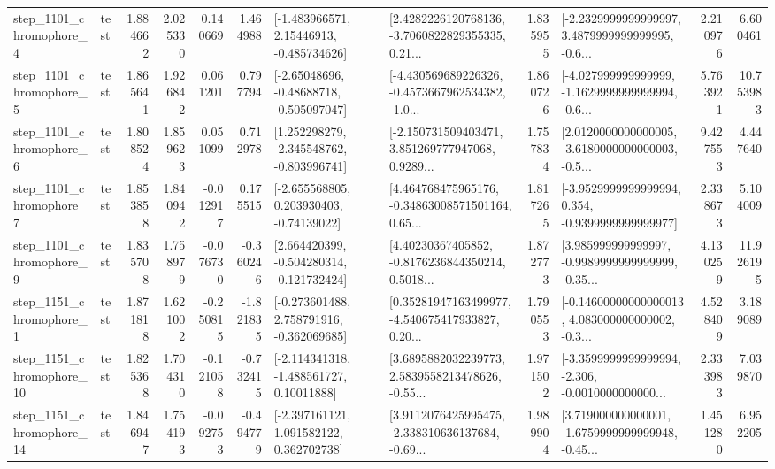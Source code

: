\begin{tabular}{llrrrrllrlrr}
  step\_1101\_chromophore\_4 &      test &      1.884662 &    2.025330 &      0.140669 &  1.464988 &    [-1.483966571, 2.15446913, -0.485734626] &  [2.4282226120768136, -3.7060822829355335, 0.21... &       1.835955 &  [-2.2329999999999997, 3.4879999999999995, -0.6... &            2.210976 &          6.600461 \\
  step\_1101\_chromophore\_5 &      test &      1.865641 &    1.926842 &      0.061201 &  0.797794 &    [-2.65048696, -0.48688718, -0.505097047] &  [-4.430569689226326, -0.4573667962534382, -1.0... &       1.860726 &  [-4.027999999999999, -1.1629999999999994, -0.6... &            5.763921 &         10.753983 \\
  step\_1101\_chromophore\_6 &      test &      1.808524 &    1.859623 &      0.051099 &  0.712978 &   [1.252298279, -2.345548762, -0.803996741] &  [-2.150731509403471, 3.851269777947068, 0.9289... &       1.757834 &  [2.0120000000000005, -3.6180000000000003, -0.5... &            9.427553 &          4.447640 \\
  step\_1101\_chromophore\_7 &      test &      1.853858 &    1.840942 &     -0.012917 &  0.175515 &    [-2.655568805, 0.203930403, -0.74139022] &  [4.464768475965176, -0.34863008571501164, 0.65... &       1.817265 &  [-3.9529999999999994, 0.354, -0.9399999999999977] &            2.338673 &          5.104009 \\
  step\_1101\_chromophore\_9 &      test &      1.835708 &    1.758979 &     -0.076730 & -0.360246 &   [2.664420399, -0.504280314, -0.121732424] &  [4.40230367405852, -0.8176236844350214, 0.5018... &       1.872773 &  [3.985999999999997, -0.9989999999999999, -0.35... &            4.130259 &         11.926195 \\
  step\_1151\_chromophore\_1 &      test &      1.871818 &    1.621002 &     -0.250815 & -1.821835 &   [-0.273601488, 2.758791916, -0.362069685] &  [0.35281947163499977, -4.540675417933827, 0.20... &       1.790553 &  [-0.14600000000000013, 4.083000000000002, -0.3... &            4.528409 &          3.189089 \\
 step\_1151\_chromophore\_10 &      test &      1.825368 &    1.704310 &     -0.121058 & -0.732415 &    [-2.114341318, -1.488561727, 0.10011888] &  [3.6895882032239773, 2.5839558213478626, -0.55... &       1.971502 &  [-3.3599999999999994, -2.306, -0.0010000000000... &            2.333983 &          7.039870 \\
 step\_1151\_chromophore\_14 &      test &      1.846947 &    1.754193 &     -0.092753 & -0.494779 &    [-2.397161121, 1.091582122, 0.362702738] &  [3.9112076425995475, -2.338310636137684, -0.69... &       1.989904 &  [3.719000000000001, -1.6759999999999948, -0.45... &            1.451280 &          6.952205 \\

\end{tabular}
